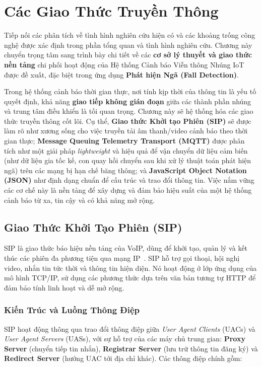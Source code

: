\section{Các Giao Thức Truyền Thông}
\label{sec:communication_protocols}
Tiếp nối các phân tích về tình hình nghiên cứu hiện có và các khoảng trống công nghệ được xác định trong phần tổng quan và tình hình nghiên cứu. Chương này chuyển trọng tâm sang trình bày chi tiết về các \textbf{cơ sở lý thuyết và giao thức nền tảng} chi phối hoạt động của Hệ thống Cảnh báo Viễn thông Nhúng IoT được đề xuất, đặc biệt trong ứng dụng \textbf{Phát hiện Ngã (Fall Detection)}.

Trong hệ thống cảnh báo thời gian thực, nơi tính kịp thời của thông tin là yếu tố quyết định, khả năng \textbf{giao tiếp không gián đoạn} giữa các thành phần nhúng và trung tâm điều khiển là tối quan trọng. Chương này sẽ hệ thống hóa các giao thức truyền thông cốt lõi. Cụ thể, \textbf{Giao thức Khởi tạo Phiên (SIP)} sẽ được làm rõ như xương sống cho việc truyền tải âm thanh/video cảnh báo theo thời gian thực; \textbf{Message Queuing Telemetry Transport (MQTT)} được phân tích như một giải pháp \textit{lightweight} và hiệu quả để vận chuyển dữ liệu cảm biến (như dữ liệu gia tốc kế, con quay hồi chuyển sau khi xử lý thuật toán phát hiện ngã) trên các mạng bị hạn chế băng thông; và \textbf{JavaScript Object Notation (JSON)} như định dạng chuẩn để cấu trúc và trao đổi thông tin. Việc nắm vững các cơ chế này là nền tảng để xây dựng và đảm bảo hiệu suất của một hệ thống cảnh báo từ xa, tin cậy và có khả năng mở rộng.
\subsection{Giao Thức Khởi Tạo Phiên (SIP)}
\label{subsec:sip_protocol}

SIP là giao thức báo hiệu nền tảng của VoIP, dùng để khởi tạo, quản lý và kết thúc các phiên đa phương tiện qua mạng IP~\cite{sip_rfc3261}. SIP hỗ trợ gọi thoại, hội nghị video, nhắn tin tức thời và thông tin hiện diện. Nó hoạt động ở lớp ứng dụng của mô hình TCP/IP, sử dụng các phương thức dựa trên văn bản tương tự HTTP để đảm bảo tính linh hoạt và dễ mở rộng.

\subsubsection{Kiến Trúc và Luồng Thông Điệp}
\label{subsubsec:sip_architecture}

SIP hoạt động thông qua trao đổi thông điệp giữa \textit{User Agent Clients} (UACs) và \textit{User Agent Servers} (UASs), với sự hỗ trợ của các máy chủ trung gian: \textbf{Proxy Server} (chuyển tiếp tin nhắn), \textbf{Registrar Server} (lưu trữ thông tin đăng ký) và \textbf{Redirect Server} (hướng UAC tới địa chỉ khác). Các thông điệp chính gồm:

